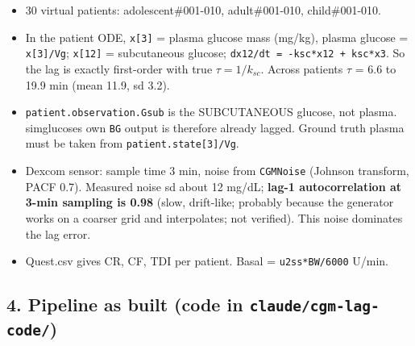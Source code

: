 \documentclass[11pt,a4paper]{article}
\providecommand{\tightlist}{\setlength{\itemsep}{0pt}\setlength{\parskip}{0pt}}
\begin{document}
\begin{itemize}
\tightlist
\item
  30 virtual patients: adolescent\#001-010, adult\#001-010,
  child\#001-010.
\item
  In the patient ODE, \texttt{x{[}3{]}} = plasma glucose mass (mg/kg),
  plasma glucose = \texttt{x{[}3{]}/Vg}; \texttt{x{[}12{]}} =
  subcutaneous glucose; \texttt{dx12/dt\ =\ -ksc*x12\ +\ ksc*x3}. So the
  lag is exactly first-order with true \(\tau = 1/k_{sc}\). Across
  patients \(\tau\) = 6.6 to 19.9 min (mean 11.9, sd 3.2).
\item
  \texttt{patient.observation.Gsub} is the SUBCUTANEOUS glucose, not
  plasma. simglucose\textquotesingle s own \texttt{BG} output is
  therefore already lagged. Ground truth plasma must be taken from
  \texttt{patient.state{[}3{]}/Vg}.
\item
  Dexcom sensor: sample time 3 min, noise from \texttt{CGMNoise}
  (Johnson transform, PACF 0.7). Measured noise sd about 12 mg/dL;
  \textbf{lag-1 autocorrelation at 3-min sampling is 0.98} (slow,
  drift-like; probably because the generator works on a coarser grid and
  interpolates; not verified). This noise dominates the lag error.
\item
  Quest.csv gives CR, CF, TDI per patient. Basal = \texttt{u2ss*BW/6000}
  U/min.
\end{itemize}

\hypertarget{4-pipeline-as-built-code-in-claudecgm-lag-code}{%
\subsection{\texorpdfstring{4. Pipeline as built (code in
\texttt{claude/cgm-lag-code/})}{4. Pipeline as built (code in claude/cgm-lag-code/)}}\label{4-pipeline-as-built-code-in-claudecgm-lag-code}}
\end{document}
